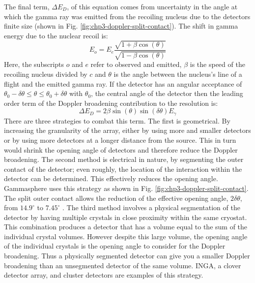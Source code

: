 The final term, $\Delta{}E_{D}$, of this equation comes from uncertainty in the angle at which the gamma ray was emitted from the recoiling nucleus due to the detectors finite size (shown in Fig. \ref{fig:chp3-doppler-split-contact}). The shift in gamma energy due to the nuclear recoil is:
\begin{equation}
\label{eqn:chp3-doppler_formula} 
E_{o} = E_{e}\frac{\sqrt{1+\beta{}\cos(\theta)}}{\sqrt{1-\beta{}\cos(\theta)}}
\end{equation}
Here, the subscripts $o$ and $e$ refer to observed and emitted, $\beta$ is the speed of the recoiling nucleus divided by $c$ and $\theta$ is the angle between the nucleus's line of a flight and the emitted gamma ray. If the detector has an angular acceptance of $\theta{}_{0}-\delta{}\theta{}\leq{}\theta{}\leq{}\theta{}_{0}+\delta{}\theta{}$ with $\theta{}_{0}$, the central angle of the detector then the leading order term of the Doppler broadening contribution to the resolution is:
\begin{equation}
\label{eqn:chp3-res-doppler-term} 
\Delta{}E_{D} = 2\beta{}\sin(\theta{})\sin(\delta{}\theta{})E_{\gamma}
\end{equation}
There are three strategies to combat this term. The first is geometrical. By increasing the granularity of the array, either by using more and smaller detectors or by using more detectors at a longer distance from the source. This in turn would shrink the opening angle of detectors and therefore reduce the Doppler broadening. The second method is electrical in nature, by segmenting the outer contact of the detector; even roughly, the location of the interaction within the detector can be determined. This effectively reduces the opening angle. Gammasphere uses this strategy as shown in Fig. \ref{fig:chp3-doppler-split-contact}. The split outer contact allows the reduction of the effective opening angle, $2\delta{}\theta{}$, from $14.9^{\circ}$ to $7.45^{\circ}$ \cite{TheGS}. The third method involves a physical segmentation of the detector by having multiple crystals in close proximity within the same cryostat. This combination produces a detector that has a volume equal to the sum of the individual crystal volumes. However despite this large volume, the opening angle of the individual crystals is the opening angle to consider for the Doppler broadening. Thus a physically segmented detector can give you a smaller Doppler broadening than an unsegmented detector of the same volume.  INGA, a clover detector array, and cluster detectors\cite{clusterDetector,cloverDet,ingaAtIUAC} are examples of this strategy.

